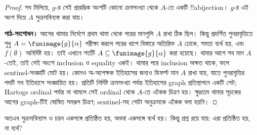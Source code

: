 \documentclass[../../../include/open-logic-section]{subfiles}
\begin{document}
\begin{proof}
সব মিলিয়ে, $g$-র সেই প্রারম্ভিক অংশটি
কোনো ক্রমসংখ্যা থেকে $A$-তে একটি
!!a{bijection}। $g$-র এই অংশ দিয়ে $A$
সুক্রমবিন্যস্ত করা যায়।
\par\noindent\textbf{পাঠ-সংশোধন।} আগের থামার নির্দেশে প্রথম থামা থেকে পরের মানগুলি $A$ রাখা
ঠিক ছিল। কিন্তু প্রদর্শিত পুনরাবৃত্তিতে শুধু
$A=\funimage{g}{\alpha}$ পরীক্ষা করলে পরের ধাপে বিস্তারে
অতিরিক্ত $A$ ঢোকে, সমতা ব্যর্থ হয়, এবং $f(\emptyset)$
অনির্দিষ্ট হয়। তাই এখানে শর্তটি
$A\subseteq\funimage{g}{\alpha}$ করা হয়েছে। থামার আগে
সব মান $A$-তেই, তাই সেই অংশে inclusion ও equality একই।
থামার পরে inclusion অক্ষত থাকে, ফলে sentinel-সংজ্ঞাটি মোট
হয়। কোনও অ-অপেক্ষক ইতিহাসের জন্যও ডিফল্ট মান $A$ রাখা
যায়, যাতে পুনরাবৃত্তির পদটি সব ইতিহাসে সংজ্ঞায়িত হয়।
প্রতিটি নির্দিষ্ট ক্রমসংখ্যা পর্যন্ত ইতিহাসের graph প্রতিস্থাপনে
একটি সেট; Hartogs ordinal পর্যন্ত না থামলে সেই ordinal
থেকে $A$-তে একৈক চিত্রণ হয়। ক্ষুদ্রতম থামার সূচকের
আগের graph-টিই ঘোষিত সমরূপ চিত্রণ; sentinel-সহ গোটা
অনুক্রমকে একৈক বলা হয়নি।
\end{proof}

অতএব সুক্রমবিন্যাস ও চয়ন একসঙ্গে প্রতিষ্ঠিত হয়,
অথবা একসঙ্গে ব্যর্থ হয়। কিন্তু প্রশ্ন রয়ে যায়:
এরা প্রতিষ্ঠিত হয়, না ব্যর্থ?
\end{document}
